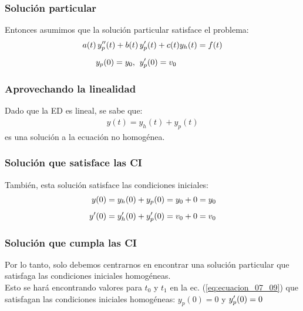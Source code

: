 \documentclass[12pt]{beamer}
\begin{document}
\begin{frame}
\frametitle{Solución particular}
Entonces asumimos que la solución particular satisface el problema:
\pause
\begin{eqnarray}
\begin{aligned}
a (t) \, {y}^{\prime \prime}_{p} (t) + b (t) \, &{y}^{\prime}_{p} (t) + c (t) y_{h} (t) = f (t) \\[0.5em]
y_{p} (0) = y_{0}, \hspace{0.2cm} &{y}^{\prime}_{p} (0) = v_{0}
\end{aligned}
\label{eq:ecuacion_07_14}
\end{eqnarray}
\end{frame}

\begin{frame}
\frametitle{Aprovechando la linealidad}
Dado que la ED es lineal, se sabe que:
\pause
\begin{align*}
y (t) = y_{h} (t) + y_{p} (t)
\end{align*}
es una solución a la ecuación no homogénea.
\end{frame}

\begin{frame}
\frametitle{Solución que satisface las CI}
También, esta solución satisface las condiciones iniciales:
\pause
\begin{align*}
y (0) &= y_{h} (0) + y_{p} (0) = y_{0} + 0 = y_{0} \\[0.5em]
{y}^{\prime} (0) &= {y}^{\prime}_{h} (0) + {y}^{\prime}_{p} (0) = v_{0} + 0 = v_{0}
\end{align*}
\end{frame}

\begin{frame}
\frametitle{Solución que cumpla las CI}
Por lo tanto, solo debemos centrarnos en encontrar una solución particular que satisfaga las condiciones iniciales homogéneas.
\\
\bigskip
\pause
Esto se hará encontrando valores para $t_{0}$ y $t_{1}$ en la ec. (\ref{eq:ecuacion_07_09}) que satisfagan las condiciones iniciales homogéneas: $y_{p} (0) = 0$ y ${y}^{\prime}_{p} (0) = 0$
\end{frame}
\end{document}
